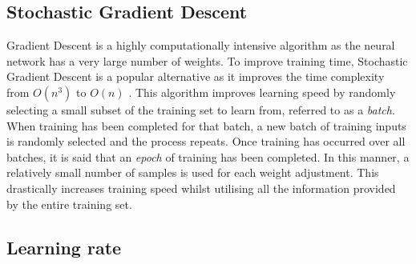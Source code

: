 
\subsection*{Stochastic Gradient Descent}\label{nnets-stochgraddesc}

Gradient Descent is a highly computationally intensive algorithm as the neural network has a very large number of weights. To improve training time, Stochastic Gradient Descent is a popular alternative as it improves the time complexity from $O(n^3)$ \citep{Marquardt1963} to $O(n)$ \citep{Robbins1951}. This algorithm improves learning speed by randomly selecting a small subset of the training set to learn from, referred to as a \textit{batch}. When training has been completed for that batch, a new batch of training inputs is randomly selected and the process repeats. Once training has occurred over all batches, it is said that an \textit{epoch} of training has been completed. In this manner, a relatively small number of samples is used for each weight adjustment. This drastically increases training speed whilst utilising all the information provided by the entire training set.

\subsection*{Learning rate}\label{nnets-learningrate}

